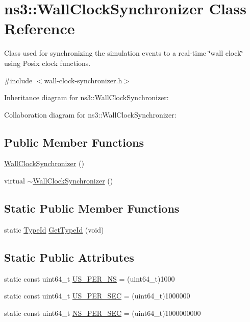 \hypertarget{classns3_1_1WallClockSynchronizer}{}\section{ns3\+:\+:Wall\+Clock\+Synchronizer Class Reference}
\label{classns3_1_1WallClockSynchronizer}


Class used for synchronizing the simulation events to a real-\/time \char`\"{}wall clock\char`\"{} using Posix clock functions.  




{\ttfamily \#include $<$wall-\/clock-\/synchronizer.\+h$>$}



Inheritance diagram for ns3\+:\+:Wall\+Clock\+Synchronizer\+:


Collaboration diagram for ns3\+:\+:Wall\+Clock\+Synchronizer\+:
\subsection*{Public Member Functions}
\begin{DoxyCompactItemize}
\item 
\hyperlink{classns3_1_1WallClockSynchronizer_ae392d9217643633b4d9859be70f89e85}{Wall\+Clock\+Synchronizer} ()
\item 
virtual \hyperlink{classns3_1_1WallClockSynchronizer_a1ee3e2964a63452e0e0791df6dafa00a}{$\sim$\+Wall\+Clock\+Synchronizer} ()
\end{DoxyCompactItemize}
\subsection*{Static Public Member Functions}
\begin{DoxyCompactItemize}
\item 
static \hyperlink{classns3_1_1TypeId}{Type\+Id} \hyperlink{classns3_1_1WallClockSynchronizer_a829a559a08fb71d5099a688515ae05c4}{Get\+Type\+Id} (void)
\end{DoxyCompactItemize}
\subsection*{Static Public Attributes}
\begin{DoxyCompactItemize}
\item 
static const uint64\+\_\+t \hyperlink{classns3_1_1WallClockSynchronizer_a80981ddf6a087e35edc1e70b2d00ab21}{U\+S\+\_\+\+P\+E\+R\+\_\+\+NS} = (uint64\+\_\+t)1000
\item 
static const uint64\+\_\+t \hyperlink{classns3_1_1WallClockSynchronizer_aaa1f121f1d08784569031c9ddd8606e7}{U\+S\+\_\+\+P\+E\+R\+\_\+\+S\+EC} = (uint64\+\_\+t)1000000
\item 
static const uint64\+\_\+t \hyperlink{classns3_1_1WallClockSynchronizer_a0bc6842f16741bda7ddea6fec357bbfd}{N\+S\+\_\+\+P\+E\+R\+\_\+\+S\+EC} = (uint64\+\_\+t)1000000000
\end{DoxyCompactItemize}
